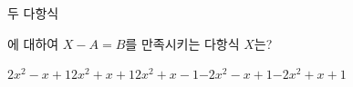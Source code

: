 두 다항식\par\smallskip{}\par\smallskip\noindent 에 대하여 $X-A=B$를 만족시키는 다항식 $X$는?
\begin{choicesii}{$2x^2-x+1$}{$2x^2+x+1$}{$2x^2+x-1$}{$-2x^2-x+1$}{$-2x^2+x+1$}\end{choicesii}
